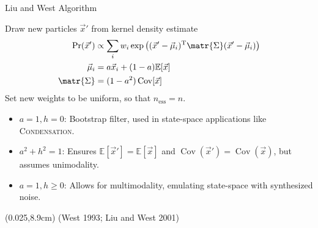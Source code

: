 \documentclass[xcolor=dvipsnames, compress]{beamer}
\newcommand{\T}{\mathrm{T}}
\newcommand{\Cov}{\operatorname{Cov}}
\newcommand{\expect}{\mathbb{E}}
\newcommand{\bottomnote}[1]{
  \begin{textblock*}{0.95\paperwidth} (0.025\paperwidth,8.9cm)
    {\tiny \hfill #1}
  \end{textblock*}
}
\begin{document}
 
\begin{frame}{Liu and West Algorithm}
  
  Draw new particles $\vec{x}'$ from kernel density estimate
  \begin{align*}
    \Pr(\vec{x}') & \propto \sum_i w_i \exp\left((\vec{x}' - \vec{\mu}_i)^\T\matr{\Sigma}(\vec{x}' - \vec{\mu}_i)\right) \\
    \vec{\mu}_i & = a \vec{x}_i + (1 - a) \mathbb{E}[\vec{x}] \\
    \matr{\Sigma} & = (1 - a^2)\Cov[\vec{x}]
  \end{align*}
  Set new weights to be uniform, so that $n_{\text{ess}} = n$.

  \begin{itemize}
    \item $a = 1, h = 0$: Bootstrap filter, used in state-space applications
      like \textsc{Condensation}.
    \item $a^2 + h^2 = 1$: Ensures $\expect[\vec{x}'] = \expect[\vec{x}]$
      and $\Cov(\vec{x}') = \Cov(\vec{x})$, but assumes unimodality.
    \item $a = 1, h \ge 0$: Allows for multimodality, emulating state-space
      with synthesized noise.
  \end{itemize}
  
  \bottomnote{(West 1993; Liu and West 2001)}
  
\end{frame}
\end{document}
